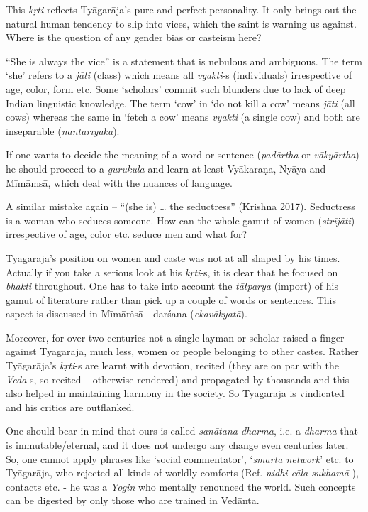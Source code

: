 \begin{enumerate}
 This \textit{kṛti} reflects Tyāgarāja’s pure and perfect personality. It only brings out the natural human tendency to slip into vices, which the saint is warning us against. Where is the question of any gender bias or casteism here?

\end{enumerate}

“She is always the vice” is a statement that is nebulous and ambiguous. The term ‘she’ refers to a \textit{jāti} (class) which means all \textit{vyakti}-s (individuals) irrespective of age, color, form etc. Some ‘scholars’ commit such blunders due to lack of deep Indian linguistic knowledge. The term ‘cow’ in ‘do not kill a cow’ means \textit{jāti} (all cows) whereas the same in ‘fetch a cow’ means \textit{vyakti} (a single cow) and both are inseparable (\textit{nāntarīyaka}). 

If one wants to decide the meaning of a word or sentence (\textit{padārtha} or \textit{vākyārtha}) he should proceed to a \textit{gurukula} and learn at least Vyākaraṇa, Nyāya and Mīmāmsā, which deal with the nuances of language. 

A similar mistake again – “(she is) … the seductress” (Krishna 2017). Seductress is a woman who seduces someone. How can the whole gamut of women (\textit{strījāti}) irrespective of age, color etc. seduce men and what for? 

Tyāgarāja’s position on women and caste was not at all shaped by his times. Actually if you take a serious look at his \textit{kṛti}-s, it is clear that he focused on \textit{bhakti} throughout. One has to take into account the \textit{tātparya} (import) of his gamut of literature rather than pick up a couple of words or sentences. This aspect is discussed in Mīmāṁsā - darśana (\textit{ekavākyatā}). 

Moreover, for over two centuries not a single layman or scholar raised a finger against Tyāgarāja, much less, women or people belonging to other castes. Rather Tyāgarāja’s \textit{kṛti}-s are learnt with devotion, recited (they are on par with the \textit{Veda}-s, so recited – otherwise rendered) and propagated by thousands and this also helped in maintaining harmony in the society. So Tyāgarāja is vindicated and his critics are outflanked. 

One should bear in mind that ours is called \textit{sanātana dharma}, i.e. a \textit{dharma} that is immutable/eternal, and it does not undergo any change even centuries later. So, one cannot apply phrases like ‘social commentator’, ‘\textit{smārta network}’ etc. to Tyāgarāja, who rejected all kinds of worldly comforts (Ref. \textit{nidhi cāla sukhamā} ), contacts etc. - he was a \textit{Yogin} who mentally renounced the world. Such concepts can be digested by only those who are trained in Vedānta.

